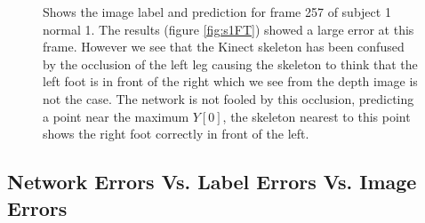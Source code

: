 \documentclass[11pt]{article} %
\begin{document}
\begin{figure}
\centering
{}%
\qquad%
%
\qquad%
%
\caption{Shows the image label and prediction for frame 257 of subject 1 normal 1. The results (figure \ref{fig:s1FT}) showed a large error at this frame. However we see that the Kinect skeleton has been confused by the occlusion of the left leg causing the skeleton to think that the left foot is in front of the right which we see from the depth image is not the case. The network is not fooled by this occlusion, predicting a point near the maximum $Y[0]$, the skeleton nearest to this point shows the right foot correctly in front of the left.}
\label{fig:ftS1_257skelAndIm}
\end{figure}


\subsection{Network Errors Vs. Label Errors Vs. Image Errors}
\end{document}
